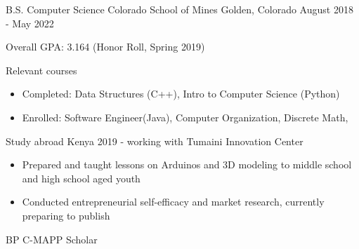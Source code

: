 \vspace{-2.0mm}


\begin{cventries}

  \cventry
    {B.S. Computer Science}
    {Colorado School of Mines} %
    {Golden, Colorado} %
    {August 2018 - May 2022} %
    {
      \begin{cvitems} %
        \item {Overall GPA: 3.164 (Honor Roll, Spring 2019)}
        \item {Relevant courses}
        \begin {itemize}
               \item {Completed: Data Structures (C++), Intro to
    Computer Science (Python)}
        \item {Enrolled: Software Engineer(Java), Computer
    Organization, Discrete Math, }
       \end {itemize}
\item {Study abroad Kenya 2019 - working with Tumaini Innovation Center}
  \begin{itemize}
    \item {Prepared and taught lessons on Arduinos and 3D modeling to
    middle school and high school aged youth}
    \item {Conducted entrepreneurial self-efficacy and market research, currently preparing to publish}
\end{itemize}
\item {BP C-MAPP Scholar}
      \end{cvitems}
    }



\end{cventries}

